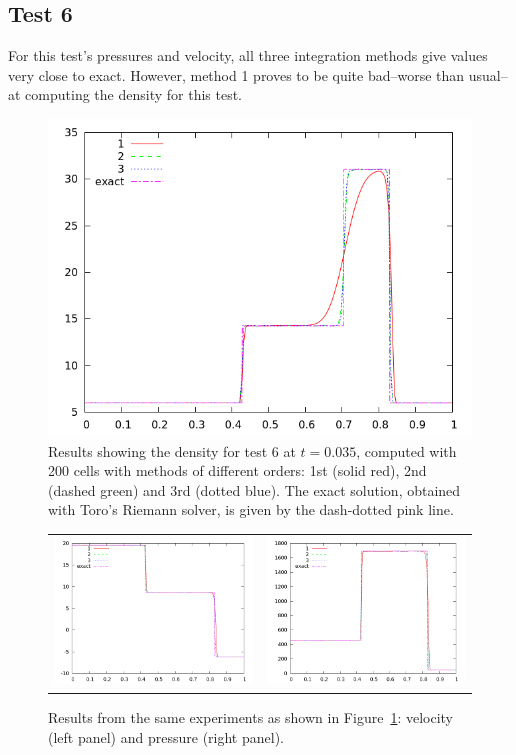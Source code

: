 \documentclass[10pt]{article}
\begin{document}
\subsection{Test 6}
For this test's pressures and velocity, all three integration methods give values very close to exact. However, method 1 proves to be quite bad--worse than usual--at computing the density for this test. 

\begin{figure}[h]
  \begin{center}
     \includegraphics[width=.78\textwidth]{den_T6.png}	
  \end{center}
  \caption{Results showing the density for test 6 at $t=0.035$, computed with 200 cells with methods of different orders: 1st (solid red), 2nd (dashed green) and 3rd (dotted blue). The exact solution, obtained with Toro's Riemann solver, is given by the dash-dotted pink line.}
  \label{fig:den_T6}
\end{figure}

\begin{figure}
  \begin{center}
	\begin{tabular}{cc}
      \includegraphics[width=.425\textwidth]{vel_T6.png} &
	  \includegraphics[width=.425\textwidth]{prs_T6.png}
	\end{tabular}
  \end{center}
  \caption{Results from the same experiments as shown in Figure~\ref{fig:den_T6}:
  velocity (left panel) and pressure (right panel).}
\end{figure}
\end{document}
